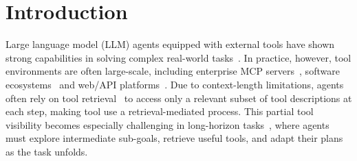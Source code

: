 \documentclass{llmxive}
\begin{document}
\begin{abstract}
\end{abstract}
\section{Introduction}



Large language model (LLM) agents equipped with external tools have shown strong capabilities in solving complex real-world tasks~\citep{ToolRL, Code2Math}. 
In practice, however, tool environments are often large-scale, including enterprise MCP servers~\citep{MCP, MCP-Bench}, software ecosystems~\citep{APIBench} and web/API platforms~\citep{ToolBench}. 
Due to context-length limitations, agents often rely on tool retrieval~\citep{ToolGen, ToolRet} to access only a relevant subset of tool descriptions at each step, making tool use a retrieval-mediated process.
This partial tool visibility becomes especially challenging in long-horizon tasks~\citep{SELFGOAL, EscapeBench}, where agents must explore intermediate sub-goals, retrieve useful tools, and adapt their plans as the task unfolds.
\end{document}
